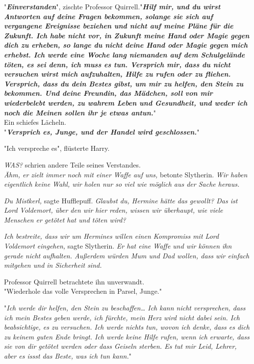 {"\textbf{\emph{Einverstanden}}", zischte Professor Quirrell."\textbf{\emph{Hilf mir, und du wirst Antworten auf deine Fragen bekommen, solange sie sich auf vergangene Ereignisse beziehen und nicht auf meine Pläne für die Zukunft. Ich habe nicht vor, in Zukunft meine Hand oder Magie gegen dich zu erheben, so lange du nicht deine Hand oder Magie gegen mich erhebst. Ich werde eine Woche lang niemanden auf dem Schulgelände töten, es sei denn, ich muss es tun. Versprich mir, dass du nicht versuchen wirst mich aufzuhalten, Hilfe zu rufen oder zu fliehen. Versprich, dass du dein Bestes gibst, um mir zu helfen, den Stein zu bekommen. Und deine Freundin, das Mädchen, soll von mir wiederbelebt werden, zu wahrem Leben und Gesundheit, und weder ich noch die Meinen sollen ihr je etwas antun.}}"\\ Ein schiefes Lächeln.\\ "\textbf{\emph{Versprich es, Junge, und der Handel wird geschlossen.}}"

"Ich verspreche es", flüsterte Harry.

\emph{WAS?} schrien andere Teile seines Verstandes.\\ \emph{Ähm, er zielt immer noch mit einer Waffe auf uns,} betonte Slytherin. \emph{Wir haben eigentlich keine Wahl, wir holen nur so viel wie möglich aus der Sache heraus.}

\emph{Du Mistkerl,} sagte Hufflepuff. \emph{Glaubst du, Hermine hätte das gewollt? Das ist Lord Voldemort, über den wir hier reden, wissen wir überhaupt, wie viele Menschen er getötet hat und töten wird?}

\emph{Ich bestreite, dass wir um Hermines willen einen Kompromiss mit Lord Voldemort eingehen,} sagte Slytherin. \emph{Er hat eine Waffe und wir können ihn gerade nicht} \emph{aufhalten. Außerdem würden Mum und Dad wollen, dass wir einfach mitgehen und in Sicherheit sind.}

Professor Quirrell betrachtete ihn unverwandt.\\ "Wiederhole das volle Versprechen in Parsel, Junge."

"\emph{Ich werde dir helfen, den Stein zu beschaffen… Ich kann nicht versprechen, dass ich mein Bestes geben werde, ich fürchte, mein Herz wird nicht dabei sein. Ich beabsichtige, es zu versuchen. Ich werde nichts tun, wovon ich denke, dass es dich zu keinem guten Ende bringt. Ich werde keine Hilfe rufen, wenn ich erwarte, dass sie von dir getötet werden oder dass Geiseln sterben. Es tut mir Leid, Lehrer, aber es issst das Beste, was ich tun kann.}"

}
